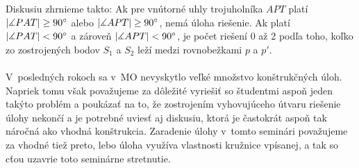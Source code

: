 {Diskusiu zhrnieme takto: Ak pre vnútorné uhly trojuholníka $APT$ platí $|\measuredangle PAT| \geq 90^\circ$ alebo $|\measuredangle APT| \geq 90^\circ$, nemá úloha riešenie. Ak platí $|\measuredangle PAT| < 90^\circ$ a zároveň $|\measuredangle APT| < 90^\circ$, je počet riešení 0 až 2 podľa toho, koľko zo zostrojených bodov $S_1$ a $S_2$ leží medzi rovnobežkami $p$ a $p'$.\\
\\
\kom V~posledných rokoch sa v~MO nevyskytlo veľké množstvo konštrukčných úloh. Napriek tomu však považujeme za dôležité vyriešiť so študentmi aspoň jeden takýto problém a poukázať na to, že zostrojením vyhovujúceho útvaru riešenie úlohy nekončí a je potrebné uviesť aj diskusiu, ktorá je častokrát aspoň tak náročná ako vhodná konštrukcia. Zaradenie úlohy v~tomto seminári považujeme za vhodné tiež preto, lebo úloha využíva vlastnosti kružnice vpísanej, a tak so cťou uzavrie toto seminárne stretnutie.
}
